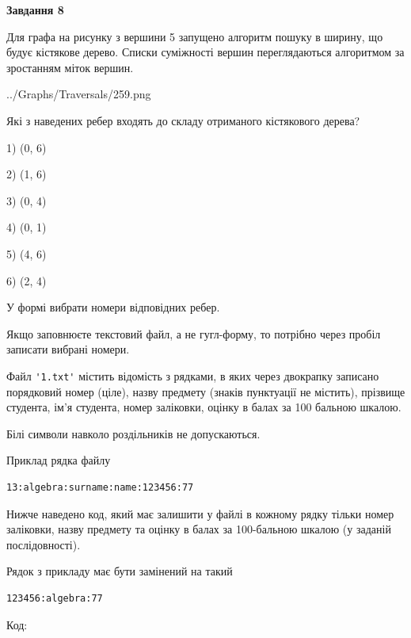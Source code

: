 \documentclass[12pt, ukrainian]{article}
\def\code#1{\Verb!#1!}
\begin{document}
{\begin {large}
{\begin {center}\textbf{Завдання 8}\end {center}}\par
Для графа на рисунку з вершини 5 запущено алгоритм пошуку в ширину, що будує кістякове дерево. Списки суміжності вершин переглядаються алгоритмом за зростанням міток вершин.\par
\begin{center}
	{../Graphs/Traversals/259.png}
\end{center}
\par Які з наведених ребер входять до складу отриманого кістякового дерева?\par
1) (0, 6)\par
2) (1, 6)\par
3) (0, 4)\par
4) (0, 1)\par
5) (4, 6)\par
6) (2, 4)\par
{\vskip 15pt} У формі вибрати номери відповідних ребер.


Якщо заповнюєте текстовий файл, а не гугл-форму, то потрібно через пробіл записа\-ти вибрані номери.\par
\newpage


Файл \code{'1.txt'} містить відомість з рядками, в яких через двокрапку записа\-но поряд\-ковий номер (ціле), назву предмету (знаків пунктуації не містить), прізвище студента, ім'я студента, номер заліковки, оцінку в балах за 100 бальною шкалою.

Білі символи навколо роздільників не допускаються.

Приклад рядка файлу



\begin{verbatim}
13:algebra:surname:name:123456:77
\end{verbatim}


Нижче наведено код, який має залишити у файлі в кожному рядку тільки номер заліковки, назву предмету та оцінку в балах за 100-бальною шкалою (у заданій послі\-дов\-ності).

Рядок з прикладу має бути замінений на такий



\begin{verbatim}
123456:algebra:77
\end{verbatim}




Код:




\end{large}}
\end{document}
